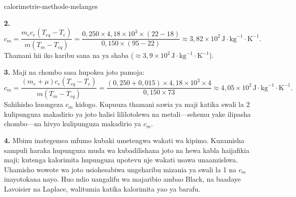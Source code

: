 \begin{exo}{calorimetrie-methode-melanges}
\begin{solution}
\textbf{2.}
\[
c_m=\frac{m_ec_e(T_{eq}-T_e)}{m(T_m-T_{eq})}
=\frac{0{,}250\times4{,}18\times10^3\times(22-18)}{0{,}150\times(95-22)}
\approx3{,}82\times10^2\,\text{J}\!\cdot\!\text{kg}^{-1}\!\cdot\!\text{K}^{-1}.
\]
Thamani hii iko karibu sana na ya shaba ($\approx3{,}9\times10^2\,\text{J}\!\cdot\!\text{kg}^{-1}\!\cdot\!\text{K}^{-1}$).

\textbf{3.} Maji na chombo sasa hupokea joto pamoja:
\[
c_m=\frac{(m_e+\mu)c_e(T_{eq}-T_e)}{m(T_m-T_{eq})}
=\frac{(0{,}250+0{,}015)\times4{,}18\times10^3\times4}{0{,}150\times73}
\approx4{,}05\times10^2\,\text{J}\!\cdot\!\text{kg}^{-1}\!\cdot\!\text{K}^{-1}.
\]
Sahihisho huongeza $c_m$ kidogo. Kupuuza thamani sawia ya maji katika swali la 2 kulipunguza makadirio ya joto halisi lililotolewa na metali—sehemu yake ilipasha chombo—na hivyo kulipunguza makadirio ya $c_m$.

\textbf{4.} Mbinu inategemea mfumo kubaki umetengwa wakati wa kipimo. Kuzamisha sampuli haraka hupunguza muda wa kubadilishana joto na hewa kabla haijafikia maji; kutenga kalorimita hupunguza upotevu nje wakati usawa unaanzishwa. Uhamisho wowote wa joto usiohesabiwa ungeharibu mizania ya swali la 1 na $c_m$ inayotokana nayo. Huo ndio uangalifu wa majaribio ambao Black, na baadaye Lavoisier na Laplace, walitumia katika kalorimita yao ya barafu.
\end{solution}
\end{exo}

